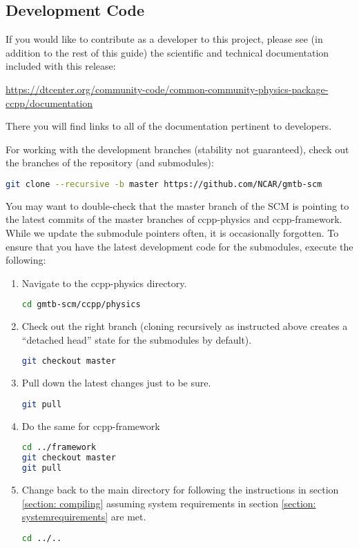 \subsection{Development Code}
\label{section: development_code}

If you would like to contribute as a developer to this project, please see (in addition to the rest of this guide) the scientific and technical documentation included with this release:

\url{https://dtcenter.org/community-code/common-community-physics-package-ccpp/documentation}

There you will find links to all of the documentation pertinent to developers.

For working with the development branches (stability not guaranteed), check out the  branches of the repository (and submodules):
\begin{lstlisting}[language=bash]
git clone --recursive -b master https://github.com/NCAR/gmtb-scm
\end{lstlisting}
You may want to double-check that the master branch of the SCM is pointing to the latest commits of the master branches of ccpp-physics and ccpp-framework. While we update the submodule pointers often, it is occasionally forgotten. To ensure that you have the latest development code for the submodules, execute the following:
\begin{enumerate}
\item Navigate to the ccpp-physics directory.
\begin{lstlisting}[language=bash]
cd gmtb-scm/ccpp/physics
\end{lstlisting}
\item Check out the right branch (cloning recursively as instructed above creates a ``detached head'' state for the submodules by default).
\begin{lstlisting}[language=bash]
git checkout master
\end{lstlisting}
\item Pull down the latest changes just to be sure.
\begin{lstlisting}[language=bash]
git pull
\end{lstlisting}
\item Do the same for ccpp-framework
\begin{lstlisting}[language=bash]
cd ../framework
git checkout master
git pull
\end{lstlisting}
\item Change back to the main directory for following the instructions in section \ref{section: compiling} assuming system requirements in section \ref{section: systemrequirements} are met.
\begin{lstlisting}[language=bash]
cd ../..
\end{lstlisting}
\end{enumerate}


